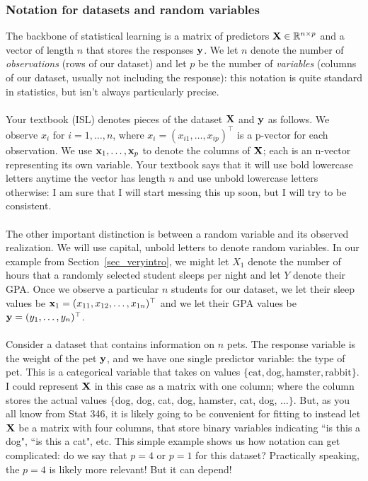 \subsubsection{Notation for datasets and random variables}

The backbone of statistical learning is a matrix of predictors $\bold{X} \in \mathbb{R}^{n \times p}$ and a vector of length $n$ that stores the responses $\bold{y}$. We let $n$ denote the number of \emph{observations} (rows of our dataset) and let $p$ be the number of \emph{variables} (columns of our dataset, usually not including the response): this notation is quite standard in statistics, but isn't always particularly precise. \\
\\
Your textbook (ISL) denotes pieces of the dataset $\bold{X}$ and $\bold{y}$ as follows. We observe $x_i$ for $i = 1,\ldots,n$, where $x_i = (x_{i1}, \ldots, x_{ip})^\top$ is a p-vector for each observation. We use $\bold{x}_1,\ldots,\bold{x}_{p}$ to denote the columns of $\bold{X}$; each is an n-vector representing its own variable. Your textbook says that it will use bold lowercase letters anytime the vector has length $n$ and use unbold lowercase letters otherwise: I am sure that I will start messing this up soon, but I will try to be consistent. \\
\\
The other important distinction is between a random variable and its observed realization. We will use capital, unbold letters to denote random variables. In our example from Section~\ref{sec_veryintro}, we might let $X_1$ denote the number of hours that a randomly selected student sleeps per night and let $Y$ denote their GPA. Once we observe a particular $n$ students for our dataset, we let their sleep values be $\bold{x}_1 = (x_{11}, x_{12},\ldots, x_{1n})^\top$ and we let their GPA values be $\bold{y} = (y_1,\ldots,y_{n})^\top$.  \\
\\
Consider a dataset that contains information on $n$ pets. The response variable is the weight of the pet $\bold{y}$, and we have one single predictor variable: the type of pet. This is a categorical variable that takes on values $\{ \text{cat}, \text{dog}, \text{hamster}, \text{rabbit} \}$. I could represent $\bold{X}$ in this case as a matrix with one column; where the column stores the actual values $\{$dog, dog, cat, dog, hamster, cat, dog, $\ldots \}$.  But, as you all know from Stat 346, it is likely going to be convenient for fitting to instead let $\bold{X}$ be a matrix with four columns, that store binary variables indicating ``is this a dog", ``is this a cat", etc. This simple example shows us how notation can get complicated: do we say that $p=4$ or $p=1$ for this dataset? Practically speaking, the $p=4$ is likely more relevant! But it can depend!  \\
